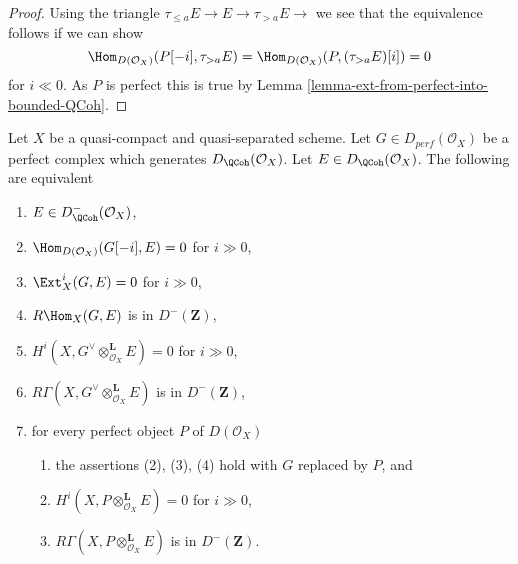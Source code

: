 \begin{proof}
Using the triangle $ \tau_{\leq a} E \to E \to \tau_{> a} E \to$
we see that the equivalence follows if we can show
$$
\Hom_{D(\mathcal{O}_X)}(P[-i], \tau_{> a} E) =
\Hom_{D(\mathcal{O}_X)}(P, (\tau_{> a} E)[i]) = 0
$$
for $i \ll 0$. As $P$ is perfect this is true by
Lemma \ref{lemma-ext-from-perfect-into-bounded-QCoh}.
\end{proof}

\begin{proposition}
\label{proposition-detecting-bounded-above}
Let $X$ be a quasi-compact and quasi-separated scheme. Let
$G \in D_{perf}(\mathcal{O}_X)$ be a perfect complex which generates 
$D_\QCoh (\mathcal{O}_X)$. Let $E \in D_\QCoh (\mathcal{O}_X)$.
The following are equivalent
\begin{enumerate}
\item $E \in D^-_\QCoh (\mathcal{O}_X)$,
\item $\Hom_{D(\mathcal{O}_X)}(G[-i], E) = 0$ for $i \gg 0$,
\item $\Ext^i_X(G, E) = 0$ for $i \gg 0$,
\item $R\Hom_X(G, E)$ is in $D^-(\mathbf{Z})$,
\item $H^i(X, G^\vee \otimes_{\mathcal{O}_X}^\mathbf{L} E) = 0$
for $i \gg 0$,
\item $R\Gamma(X, G^\vee \otimes_{\mathcal{O}_X}^\mathbf{L} E)$
is in $D^-(\mathbf{Z})$,
\item for every perfect object $P$ of $D(\mathcal{O}_X)$
\begin{enumerate}
\item the assertions (2), (3), (4) hold with $G$ replaced by $P$, and
\item $H^i(X, P \otimes_{\mathcal{O}_X}^\mathbf{L} E) = 0$ for $i \gg 0$,
\item $R\Gamma(X, P \otimes_{\mathcal{O}_X}^\mathbf{L} E)$
is in $D^-(\mathbf{Z})$.
\end{enumerate}
\end{enumerate}
\end{proposition}

